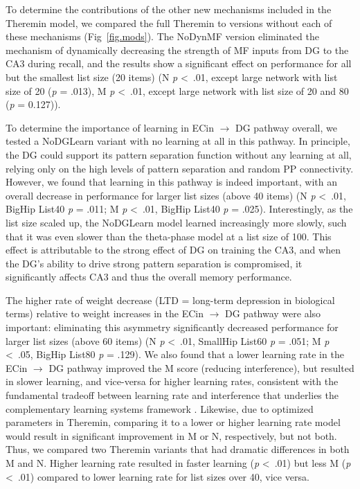 \documentclass[11pt,twoside]{article}
\newif\myifpdf
\begin{document}
To determine the contributions of the other new mechanisms included in the Theremin model, we compared the full Theremin to versions without each of these mechanisms (Fig~\ref{fig.mods}).  The NoDynMF version eliminated the mechanism of dynamically decreasing the strength of MF inputs from DG to the CA3 during recall, and the results show a significant effect on performance for all but the smallest list size (20 items) (N \emph{p} \textless \ .01, except large network with list size of 20 (\emph{p} = .013), M \emph{p} \textless \ .01, except large network with list size of 20 and 80 (\emph{p} = 0.127)). 

To determine the importance of learning in ECin $\rightarrow$ DG pathway overall, we tested a NoDGLearn variant with no learning at all in this pathway.  In principle, the DG could support its pattern separation function without any learning at all, relying only on the high levels of pattern separation and random PP connectivity.  However, we found that learning in this pathway is indeed important, with an overall decrease in performance for larger list sizes (above 40 items) (N \emph{p} \textless \ .01, BigHip List40 \emph{p} = .011; M \emph{p} \textless \ .01, BigHip List40 \emph{p} = .025).  Interestingly, as the list size scaled up, the NoDGLearn model learned increasingly more slowly, such that it was even slower than the theta-phase model at a list size of 100. This effect is attributable to the strong effect of DG on training the CA3, and when the DG's ability to drive strong pattern separation is compromised, it significantly affects CA3 and thus the overall memory performance.

The higher rate of weight decrease (LTD = long-term depression in biological terms) relative to weight increases in the ECin $\rightarrow$ DG pathway were also important: eliminating this asymmetry significantly decreased performance for larger list sizes (above 60 items) (N \emph{p} \textless \ .01, SmallHip List60 \emph{p} = .051; M \emph{p} \textless \ .05, BigHip List80 \emph{p} = .129).  We also found that a lower learning rate in the ECin $\rightarrow$ DG pathway improved the M score (reducing interference), but resulted in slower learning, and vice-versa for higher learning rates, consistent with the fundamental tradeoff between learning rate and interference that underlies the complementary learning systems framework \citep{McClellandMcNaughtonOReilly95}.  Likewise, due to optimized parameters in Theremin, comparing it to a lower or higher learning rate model would result in significant improvement in M or N, respectively, but not both. Thus, we compared two Theremin variants that had dramatic differences in both M and N. Higher learning rate resulted in faster learning (\emph{p} \textless \ .01) but less M (\emph{p} \textless \ .01) compared to lower learning rate for list sizes over 40, vice versa.
\end{document}
